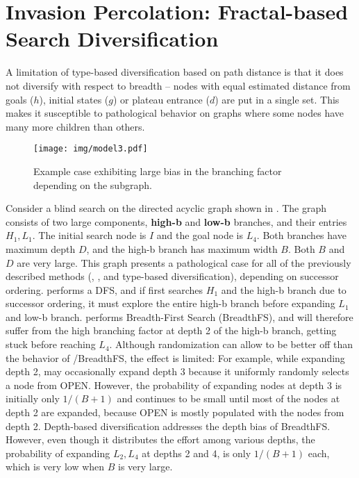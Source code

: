 
\chapter[Invasion Percolation]{Invasion Percolation: Fractal-based Search Diversification}

\label{sec:ip}

A limitation of  type-based diversification based on path distance %
is that it does not diversify with respect to breadth -- 
nodes with equal estimated distance from goals ($h$), initial states ($g$) or plateau entrance ($d$) are put in a single set.
This makes it susceptible to pathological behavior on graphs where some nodes have many more children than others.

\begin{figure}[hbt]
 \centering
 \texttt{[image: img/model3.pdf]}
 \caption{Example case exhibiting large bias in the branching factor depending on the subgraph.}
 \label{fig:model}
\end{figure}

Consider a blind search on the directed acyclic graph
shown in .
The graph consists of two large components, \textbf{high-b} and \textbf{low-b} branches, and their entries $H_1,L_1$. The initial search node is $I$ and the goal node is $L_4$.
Both branches have maximum depth $D$, and the high-b branch has maximum width $B$.
Both $B$ and $D$ are very large.
This graph presents a pathological case for all of the previously described methods (\lifo, \fifo, \ro and type-based diversification), depending on successor ordering.
\lifo performs a DFS, and if \lifo first searches $H_1$ and the high-b branch due to successor ordering, it must explore the entire high-b branch before expanding $L_1$ and low-b branch.
\fifo performs Breadth-First Search (BreadthFS), and  will therefore suffer from the  high branching factor at depth 2 of the high-b branch, getting stuck before reaching $L_4$.
Although randomization can allow \ro to be better off than the behavior of \fifo/BreadthFS, the effect is limited:
For example, while expanding depth 2, \ro may occasionally expand depth 3 because it uniformly randomly selects a node from OPEN.
However, the probability of expanding nodes at depth 3 is initially only $1/(B+1)$ and continues to be small until  most of the nodes at depth 2 are expanded, 
because OPEN is mostly populated with the nodes from depth 2.
Depth-based diversification addresses the depth bias of BreadthFS.
However, even though it distributes the effort among various depths,
the probability of expanding $L_2,L_4$ at depths 2 and 4, is only $1/(B+1)$ each, which is very low when $B$ is very large.

